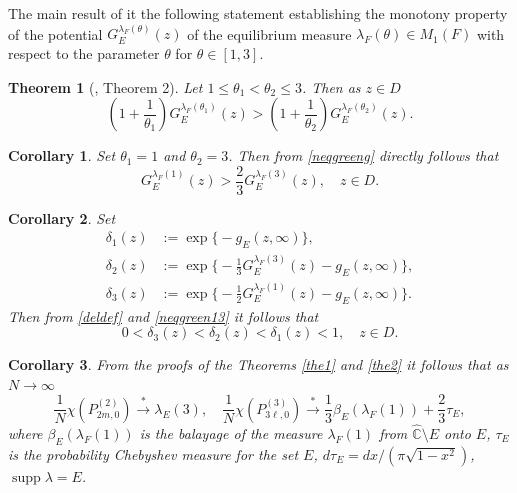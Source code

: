 \documentclass[11pt, a4paper, twoside]{article}
\def\({\left(}
\def\){\right)}
\let\leq\leqslant
\let\myh\widehat
\def\CC{\mathbb C}
\def\supp{\operatorname{supp}}
\theoremstyle{plain}
\newtheorem{theorem}{Theorem}
\newtheorem{corollary}{Corollary}
\theoremstyle{definition}
\begin{document}
The main result of \cite{IkSu24} it the following statement establishing the monotony property of the potential
$G_E^{\lambda_F(\theta)}(z)$ of the equilibrium measure $\lambda_F(\theta)\in M_1(F)$ with respect to the parameter  $\theta$    for $\theta\in[1,3]$.

\begin{theorem}[\cite{IkSu24}, Theorem 2]\label{the3}
Let $1\leq\theta_1<\theta_2\leq3$. Then as $z\in{D}$
\begin{equation}
\(1+\frac1{\theta_1}\)G^{\lambda_F(\theta_1)}_E(z)>
\(1+\frac1{\theta_2}\)G^{\lambda_F(\theta_2)}_E(z).
\label{neqgreeng}
\end{equation}
\end{theorem}

\begin{corollary}\label{cor1}
Set $\theta_1=1$ and $\theta_2=3$. Then from \eqref{neqgreeng} directly follows that 
\begin{equation}
G^{\lambda_F(1)}_E(z)>\frac23 G^{\lambda_F(3)}_E(z),\quad z\in D.
\label{neqgreen13}
\end{equation}
\end{corollary}

\begin{corollary}\label{cor2}
Set
\begin{equation}
\begin{aligned}
\delta_1(z)&:=\exp\bigl\{-g_E(z,\infty)\bigr\},\\
\delta_2(z)&:=\exp\biggl\{-\frac13G^{\lambda_F(3)}_E(z)-g_E(z,\infty)\biggr\}, \\
\delta_3(z)&:=\exp\biggl\{-\frac12G^{\lambda_F(1)}_E(z)-g_E(z,\infty)\biggr\}.
\end{aligned}
\label{deldef}
\end{equation}
Then from \eqref{deldef} and \eqref{neqgreen13} it follows that 
\begin{equation}
0<\delta_3(z)<\delta_2(z)<\delta_1(z)<1,\quad z\in D.
\label{delrel}
\end{equation}
\end{corollary}

\begin{corollary}\label{cor3}
From the proofs of the Theorems \ref{the1} and \ref{the2} it follows that as  $N\to\infty$
$$
\frac1N\chi(P^{(2)}_{2m,0})
\overset{*}\longrightarrow
\lambda_E(3),
\quad 
\frac1N\chi(P^{(3)}_{3\ell,0})
\overset{*}\longrightarrow
\frac13\beta_E(\lambda_F(1))+\frac23\tau_E,
$$
where $\beta_E(\lambda_F(1))$ is the balayage of the measure $\lambda_F(1)$ from $\myh{\CC}\setminus E$ onto $E$,
$\tau_E$ is the probability Chebyshev measure for the set $E$, $d\tau_E=dx/(\pi\sqrt{1-x^2})$, $\supp{\lambda}=E$.
\end{corollary}
\end{document}
